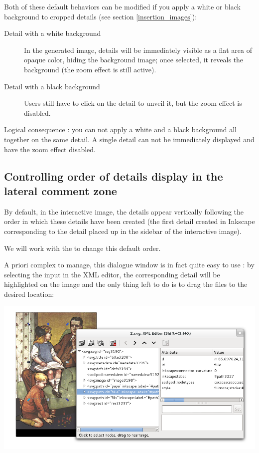 Both of these default behaviors can be modified if you apply a white
 or black background to cropped details (see section 
\ref{insertion_images}):
\begin{description}
 \item [Detail with a white background] In the generated image, details will be
 immediately visible as a flat area of opaque color, hiding the background image;  
 once selected, it reveals the background (the zoom effect is still active).
 \item [Detail with a black background] Users still have to click on the detail to unveil it, but the zoom effect is disabled.
\end{description}

Logical consequence : you can not apply a white and a black background all together on the same detail.
A single detail can not be immediately displayed and have the zoom effect disabled.

\subsection{Controlling order of details display in the lateral comment zone}\label{XML_layer}

By default, in the interactive image, the details appear vertically following the order
in which these details have been created (the first detail created in Inkscape corresponding 
to the detail placed up in the sidebar of the interactive image).

We will work with the  to change this default order.

A priori complex to manage, this dialogue window is in fact quite easy to use : 
by selecting the input in the XML editor, the corresponding detail will be
highlighted on the image and the only thing left 
to do is to drag the files to the desired location:\\

\begin{center}
 \includegraphics[width=\textwidth]{images/layerorder}\\
\end{center}
 
